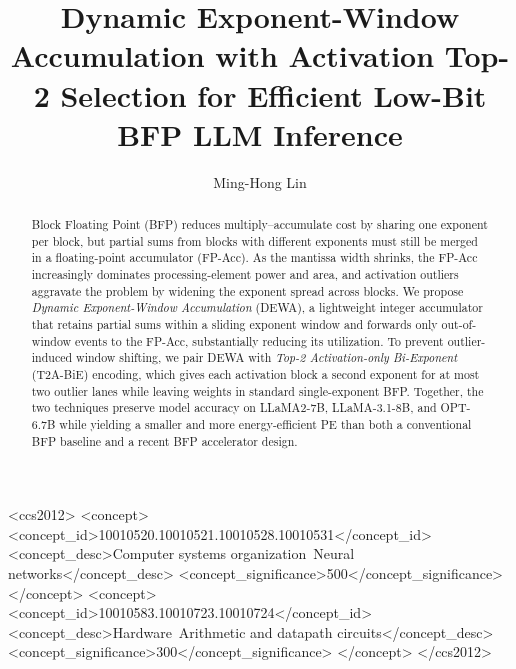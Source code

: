 \documentclass[sigconf]{acmart}
\title[DEWA with Activation Top-2 Selection]{Dynamic Exponent-Window Accumulation with Activation Top-2 Selection for Efficient Low-Bit BFP LLM Inference}
\author{Ming-Hong Lin}
\affiliation{%
  \institution{National Taiwan University of Science and Technology}
  \department{Department of Electrical Engineering}
  \city{Taipei}
  \country{Taiwan}}
\begin{document}
\begin{abstract}
Block Floating Point (BFP) reduces multiply--accumulate cost by sharing one exponent per block, but partial sums from blocks with different exponents must still be merged in a floating-point accumulator (FP-Acc).
As the mantissa width shrinks, the FP-Acc increasingly dominates processing-element power and area, and activation outliers aggravate the problem by widening the exponent spread across blocks.
We propose \emph{Dynamic Exponent-Window Accumulation} (DEWA), a lightweight integer accumulator that retains partial sums within a sliding exponent window and forwards only out-of-window events to the FP-Acc, substantially reducing its utilization.
To prevent outlier-induced window shifting, we pair DEWA with \emph{Top-2 Activation-only Bi-Exponent} (T2A-BiE) encoding, which gives each activation block a second exponent for at most two outlier lanes while leaving weights in standard single-exponent BFP.
Together, the two techniques preserve model accuracy on LLaMA2-7B, LLaMA-3.1-8B, and OPT-6.7B while yielding a smaller and more energy-efficient PE than both a conventional BFP baseline and a recent BFP accelerator design.
\end{abstract}

\begin{CCSXML}
<ccs2012> 
 <concept>
  <concept_id>10010520.10010521.10010528.10010531</concept_id>
  <concept_desc>Computer systems organization~Neural networks</concept_desc>
  <concept_significance>500</concept_significance>
 </concept>
 <concept>
  <concept_id>10010583.10010723.10010724</concept_id>
  <concept_desc>Hardware~Arithmetic and datapath circuits</concept_desc>
  <concept_significance>300</concept_significance>
 </concept> 
</ccs2012>
\end{CCSXML}



\maketitle










\end{document}
